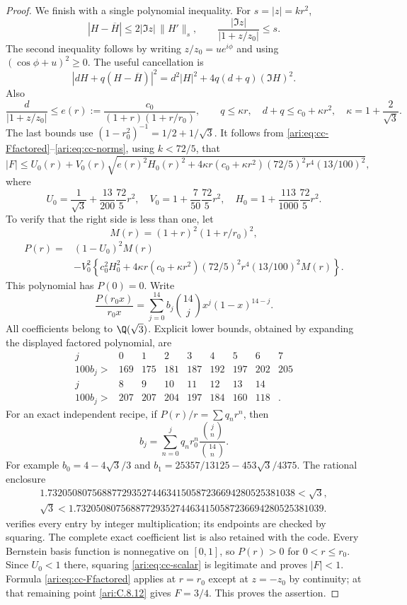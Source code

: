 \begin{proof}
We finish with a single polynomial inequality. For $s=|z|=kr^2$,
\[
 |H-\overline H|\le2|\Im z|\,\|H'\|_s,\qquad
 \frac{|\Im z|}{|1+z/z_0|}\le s.
\]
The second inequality follows by writing $z/z_0=ue^{i\phi}$
and using $(\cos\phi+u)^2\ge0$. The useful cancellation is
\[
 |dH+q(H-\overline H)|^2
      =d^2|H|^2+4q(d+q)(\Im H)^2.
\]
Also
\[
 \frac d{|1+z/z_0|}\le
 e(r):=\frac{c_0}{(1+r)(1+r/r_0)},\qquad
 q\le\kappa r,\quad d+q\le c_0+\kappa r^2,
 \quad\kappa=1+\frac2{\sqrt3}.
\]
The last bounds use $(1-r_0^2)^{-1}=1/2+1/\sqrt3$.
It follows from \eqref{ari:eq:cc-Ffactored}--\eqref{ari:eq:cc-norms},
using $k<72/5$, that
\begin{equation}\label{ari:eq:cc-scalar}
 |F|\le U_0(r)+V_0(r)
 \sqrt{e(r)^2H_0(r)^2+
       4\kappa r(c_0+\kappa r^2)(72/5)^2r^4(13/100)^2},
\end{equation}
where
\[
 U_0=\frac1{\sqrt3}+\frac{13}{200}\frac{72}{5}r^2,
 \quad V_0=1+\frac7{50}\frac{72}{5}r^2,
 \quad H_0=1+\frac{113}{1000}\frac{72}{5}r^2.
\]
To verify that the right side is less than one, let
\[
 M(r)=(1+r)^2(1+r/r_0)^2,
\]
\begin{equation}\label{ari:eq:cc-P}
 \begin{aligned}
 P(r)={}&(1-U_0)^2M(r)\\
 &-V_0^2\left\{c_0^2H_0^2+
 4\kappa r(c_0+\kappa r^2)(72/5)^2r^4(13/100)^2M(r)\right\}.
 \end{aligned}
\end{equation}
This polynomial has $P(0)=0$. Write
\[
 \frac{P(r_0x)}{r_0x}
     =\sum_{j=0}^{14}b_j\binom{14}{j}x^j(1-x)^{14-j}.
\]
All coefficients belong to $\Q(\sqrt3)$. Explicit lower bounds,
obtained by expanding the displayed factored polynomial, are
\[
 \begin{array}{c|rrrrrrrr}
 j&0&1&2&3&4&5&6&7\\ \hline
 100b_j>&169&175&181&187&192&197&202&205\\[2pt]
 j&8&9&10&11&12&13&14&\\ \hline
 100b_j>&207&207&204&197&184&160&118&.
 \end{array}
\]
For an exact independent recipe, if $P(r)/r=\sum q_nr^n$,
then
\[
 b_j=\sum_{n=0}^j q_nr_0^n
                  \frac{\binom jn}{\binom{14}n}.
\]
For example $b_0=4-4\sqrt3/3$ and
$b_1=25357/13125-453\sqrt3/4375$. The rational enclosure
\[
 \begin{gathered}
 1.73205080756887729352744634150587236694280525381038<\sqrt3,\\
 \sqrt3<1.73205080756887729352744634150587236694280525381039.
 \end{gathered}
\]
verifies every entry by integer multiplication; its endpoints
are checked by squaring. The complete exact coefficient list is
also retained with the code. Every Bernstein basis function is
nonnegative on $[0,1]$, so $P(r)>0$ for $0<r\le r_0$.
Since $U_0<1$ there, squaring \eqref{ari:eq:cc-scalar} is legitimate
and proves $|F|<1$. Formula \eqref{ari:eq:cc-Ffactored} applies
at $r=r_0$ except at $z=-z_0$ by continuity; at that remaining
point \ref{ari:C.8.12} gives $F=3/4$. This proves the assertion.
\end{proof}

